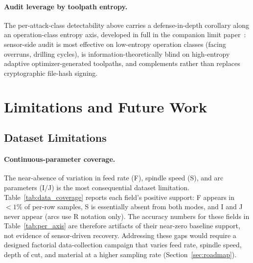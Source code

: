 \documentclass[sensors,article,submit,moreauthors,pdftex]{Definitions/mdpi}
\begin{document}
\paragraph{Audit leverage by toolpath entropy.} The per-attack-class detectability above carries a defense-in-depth corollary along an operation-class entropy axis, developed in full in the companion limit paper~\cite{paperB_entropy}: sensor-side audit is most effective on low-entropy operation classes (facing overruns, drilling cycles), is information-theoretically blind on high-entropy adaptive optimizer-generated toolpaths, and complements rather than replaces cryptographic file-hash signing.

\section{Limitations and Future Work}
\label{sec:future}

\subsection{Dataset Limitations}
\label{sec:lim-dataset}

\paragraph{Continuous-parameter coverage.} The near-absence of variation in feed rate (F), spindle speed (S), and arc parameters (I/J) is the most consequential dataset limitation. Table~\ref{tab:data_coverage} reports each field's positive support: F appears in $<\!1\%$ of per-row samples, S is essentially absent from both modes, and I and J never appear (arcs use R notation only). The accuracy numbers for these fields in Table~\ref{tab:per_axis} are therefore artifacts of their near-zero baseline support, not evidence of sensor-driven recovery. Addressing these gaps would require a designed factorial data-collection campaign that varies feed rate, spindle speed, depth of cut, and material at a higher sampling rate (Section~\ref{sec:roadmap}).
\end{document}
